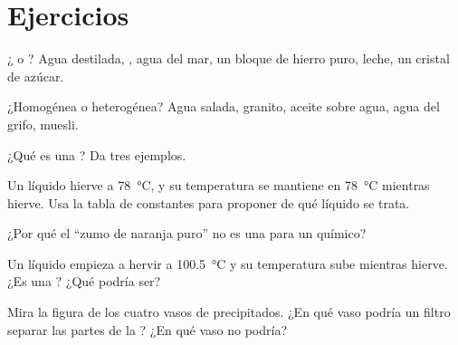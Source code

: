 \section{Ejercicios}

\begin{exercise}[$\star$]\label{exo:g6:pure-substances-and-mixtures:1}
¿ o ? Agua destilada, , agua del mar, un bloque
de hierro puro, leche, un cristal de azúcar.
\end{exercise}

\begin{exercise}[$\star$]\label{exo:g6:pure-substances-and-mixtures:2}
¿Homogénea o heterogénea? Agua salada, granito, aceite sobre agua, agua
del grifo, muesli.
\end{exercise}

\begin{exercise}[$\star$]\label{exo:g6:pure-substances-and-mixtures:3}
¿Qué es una ? Da tres ejemplos.
\end{exercise}

\begin{exercise}[$\star$]\label{exo:g6:pure-substances-and-mixtures:4}
Un líquido hierve a \qty{78}{\celsius}, y su temperatura se mantiene
en \qty{78}{\celsius} mientras hierve. Usa la tabla de constantes para
proponer de qué líquido se trata.
\end{exercise}

\begin{exercise}[$\star$]\label{exo:g6:pure-substances-and-mixtures:5}
¿Por qué el ``zumo de naranja puro'' no es una  para un
químico?
\end{exercise}

\begin{exercise}[$\star\star$]\label{exo:g6:pure-substances-and-mixtures:6}
Un líquido empieza a hervir a \qty{100.5}{\celsius} y su temperatura
sube mientras hierve. ¿Es una ? ¿Qué podría ser?
\end{exercise}

\begin{exercise}[$\star\star$]\label{exo:g6:pure-substances-and-mixtures:7}
Mira la figura de los cuatro vasos de precipitados. ¿En qué vaso podría
un filtro separar las partes de la ? ¿En qué vaso no podría?
\end{exercise}

